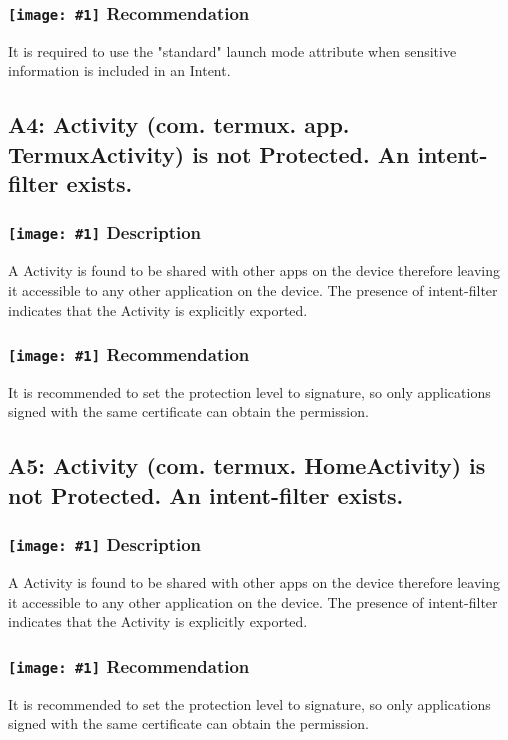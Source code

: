 \documentclass[12p]{article}
\newcommand{\icon}[1]{\texttt{[image: \#1]}}
\begin{document}
\subsubsection*{\protect\icon{/home/miki/Documents/GITHUB/AndroidPermissions/python/vulns/report_icons/basic_todo.png} Recommendation}
It is required to use the "standard" launch mode attribute when sensitive information is included in an Intent.
\subsection{A4: Activity (com. termux. app. TermuxActivity) is not Protected. An intent-filter exists.}
\subsubsection*{\protect\icon{/home/miki/Documents/GITHUB/AndroidPermissions/python/vulns/report_icons/basic_sheet.png} Description}
A  Activity is found to be shared with other apps on the device therefore leaving it accessible to any other application on the device. The presence of intent-filter indicates that the Activity is explicitly exported.
\subsubsection*{\protect\icon{/home/miki/Documents/GITHUB/AndroidPermissions/python/vulns/report_icons/basic_todo.png} Recommendation}
It is recommended to set the protection level to signature, so only applications signed with the same certificate can obtain the permission.
\subsection{A5: Activity (com. termux. HomeActivity) is not Protected. An intent-filter exists.}
\subsubsection*{\protect\icon{/home/miki/Documents/GITHUB/AndroidPermissions/python/vulns/report_icons/basic_sheet.png} Description}
A  Activity is found to be shared with other apps on the device therefore leaving it accessible to any other application on the device. The presence of intent-filter indicates that the Activity is explicitly exported.
\subsubsection*{\protect\icon{/home/miki/Documents/GITHUB/AndroidPermissions/python/vulns/report_icons/basic_todo.png} Recommendation}
It is recommended to set the protection level to signature, so only applications signed with the same certificate can obtain the permission.
\end{document}
